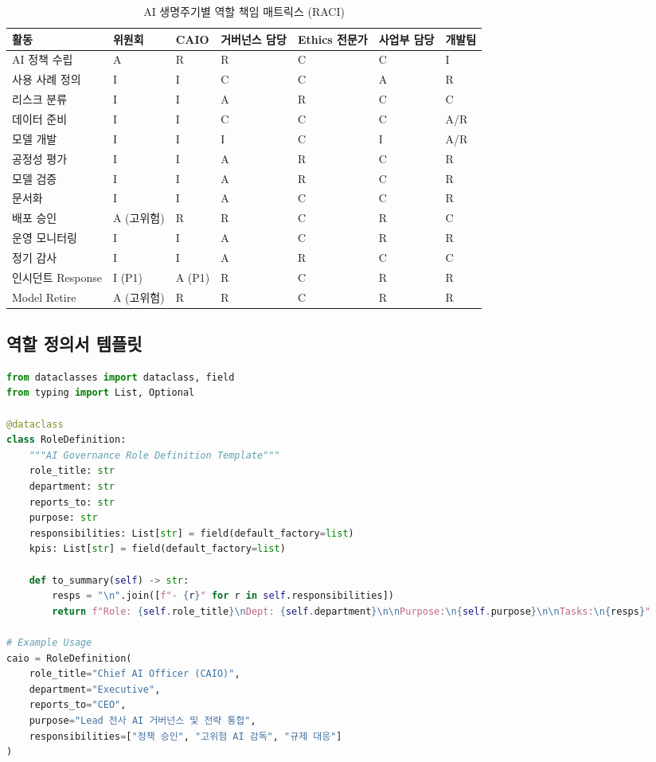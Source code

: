 \begin{table}[htbp]
\centering
\caption{AI 생명주기별 역할 책임 매트릭스 (RACI)}
\label{tab:raci_lifecycle}
\begin{tabularx}{\textwidth}{p{3cm}XXXXXX}
\toprule
\textbf{활동} & \textbf{위원회} & \textbf{CAIO} & \textbf{거버넌스 담당} & \textbf{Ethics 전문가} & \textbf{사업부 담당} & \textbf{개발팀} \\
\midrule
AI 정책 수립 & A & R & R & C & C & I \\
\midrule
사용 사례 정의 & I & I & C & C & A & R \\
\midrule
리스크 분류 & I & I & A & R & C & C \\
\midrule
데이터 준비 & I & I & C & C & C & A/R \\
\midrule
모델 개발 & I & I & I & C & I & A/R \\
\midrule
공정성 평가 & I & I & A & R & C & R \\
\midrule
모델 검증 & I & I & A & R & C & R \\
\midrule
문서화 & I & I & A & C & C & R \\
\midrule
배포 승인 & A (고위험) & R & R & C & R & C \\
\midrule
운영 모니터링 & I & I & A & C & R & R \\
\midrule
정기 감사 & I & I & A & R & C & C \\
\midrule
인시던트 Response & I (P1) & A (P1) & R & C & R & R \\
\midrule
Model Retire & A (고위험) & R & R & C & R & R \\
\bottomrule
\end{tabularx}
\end{table}


\subsection{역할 정의서 템플릿}
\label{sec:4.2.3}

\begin{lstlisting}[language=Python, caption={Automated Role Definition Generation}, label={lst:role_definition}]
from dataclasses import dataclass, field
from typing import List, Optional

@dataclass
class RoleDefinition:
    """AI Governance Role Definition Template"""
    role_title: str
    department: str
    reports_to: str
    purpose: str
    responsibilities: List[str] = field(default_factory=list)
    kpis: List[str] = field(default_factory=list)

    def to_summary(self) -> str:
        resps = "\n".join([f"- {r}" for r in self.responsibilities])
        return f"Role: {self.role_title}\nDept: {self.department}\n\nPurpose:\n{self.purpose}\n\nTasks:\n{resps}"

# Example Usage
caio = RoleDefinition(
    role_title="Chief AI Officer (CAIO)",
    department="Executive",
    reports_to="CEO",
    purpose="Lead 전사 AI 거버넌스 및 전략 통합",
    responsibilities=["정책 승인", "고위험 AI 감독", "규제 대응"]
)
\end{lstlisting}


